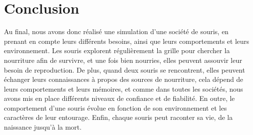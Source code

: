 \section{Conclusion}
\label{sec:conclusion}

Au final, nous avons donc réalisé une simulation d'une société de souris, en prenant en compte leurs différents besoins, ainsi que leurs comportements et leurs environnement. Les souris explorent régulièrement la grille pour chercher la nourriture afin de survivre, et une fois bien nourries, elles peuvent assouvir leur besoin de reproduction. De plus, quand deux souris se rencontrent, elles peuvent échanger leurs connaissances à propos des sources de nourriture, cela dépend de leurs comportements et leurs mémoires, et comme dans toutes les sociétés, nous
avons mis en place différents niveaux de confiance et de fiabilité. En outre, le comportement d’une souris évolue en fonction de son environnement et les caractères de leur entourage. Enfin, chaque souris peut raconter sa vie, de la naissance jusqu'à la mort.